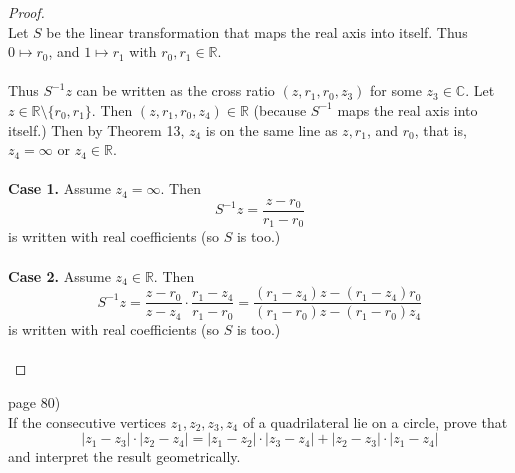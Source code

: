 \documentclass{article}
\newenvironment{problem}[2][Problem]{\begin{trivlist}
\item[\hskip \labelsep {\bfseries #1}\hskip \labelsep {\bfseries #2.}]}{\end{trivlist}}
\begin{document}
\begin{proof} \text{} \\
  Let $S$ be the linear transformation that maps the real axis into itself.
  Thus $0 \mapsto r_0$, and $1 \mapsto r_1$ with $r_0, r_1 \in \mathbb{R}$.\\
  \\
  Thus $S^{-1}z$ can be written as the cross ratio $(z, r_1, r_0, z_3)$ for some
  $z_3 \in \mathbb{C}$. Let $z \in \mathbb{R} \setminus \{r_0, r_1\}$.
  Then $(z, r_1, r_0, z_4) \in \mathbb{R}$
  (because $S^{-1}$ maps the real axis into itself.) Then by Theorem 13, $z_4$ is
  on the same line as $z, r_1$, and $r_0$, that is, $z_4 = \infty$ or
  $z_4 \in \mathbb{R}$.\\
  \\
  \textbf{Case 1.} Assume $z_4 = \infty$. Then \[
    S^{-1}z = \frac{z - r_0}{r_1 - r_0}
  \] is written with real coefficients (so $S$ is too.)\\
  \\
  \textbf{Case 2.} Assume $z_4 \in \mathbb{R}$. Then \[
    S^{-1}z = \frac{z - r_0}{z - z_4} \cdot \frac{r_1 - z_4}{r_1 - r_0} = \frac{(r_1 - z_4)z - (r_1 - z_4)r_0}{(r_1 - r_0)z - (r_1 - r_0)z_4}
  \] is written with real coefficients (so $S$ is too.)\\
  \\
\end{proof}

\pagebreak

\begin{problem}{3} (page 80) \\
  If the consecutive vertices $z_1, z_2, z_3, z_4$ of a quadrilateral lie on a
  circle, prove that \[
    |z_1 - z_3| \cdot |z_2 - z_4|
      = |z_1 - z_2| \cdot |z_3 - z_4|
      + |z_2 - z_3| \cdot |z_1 - z_4|
  \] and interpret the result geometrically.
\end{problem}
\end{document}
